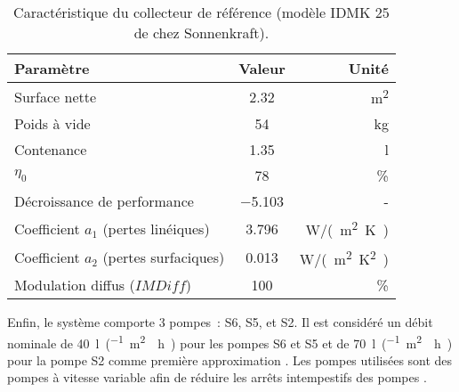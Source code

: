 \begin{table}
\centering
\caption{Caractéristique du collecteur de référence (modèle IDMK 25 de chez Sonnenkraft).}
\label{tab:idmk_specs}
\begin{tabular}{lcr}
    \toprule
    Paramètre                                & Valeur         & Unité                 \\
    \midrule
    Surface nette                            & \num{2.32}           & \si{m^{2}}            \\
    Poids à vide                             & \num{54}             & \si{kg}               \\
    Contenance                               & \num{1.35}           & \si{l}                \\
    $\eta_{0}$                               & \num{78}             & \si{\%}               \\
    Décroissance de performance              & \num{-5.103}         & -                     \\
    Coefficient $a_{1}$ (pertes linéiques)   & \num{3.796}          & \si{W/(m^{2}.K)}      \\
    Coefficient $a_{2}$ (pertes surfaciques) & \num{0.013}          & \si{W/(m^{2}.K^{2})}  \\
    Modulation diffus ($IMDiff$)             & \num{100}            & \si{\%}               \\
    \bottomrule
\end{tabular}
\end{table}


Enfin, le système comporte 3 pompes~: S6, S5, et S2. Il est considéré un débit nominale de \SI{40}{\litre\per(\meter\squared\period\hour)}
pour les pompes S6 et S5 et de \SI{70}{\litre\per(\meter\squared\period\hour)} pour la pompe S2 comme
première approximation \parencite{Peuser2005}. Les pompes utilisées sont des pompes à vitesse variable
afin de réduire les arrêts intempestifs des pompes \parencite{Kicsiny20123489}.



